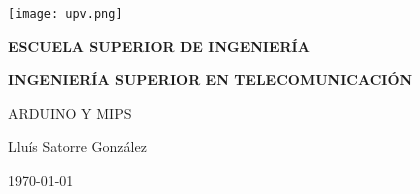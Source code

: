 

\begin{titlepage}

  \begin{center}

    \texttt{[image: upv.png]} \\
    
    \vspace{2.0cm}
    
    \LARGE{\textbf{ESCUELA SUPERIOR DE INGENIERÍA}} \\
    
    \vspace{1.0cm}
    
    \Large{\textbf{INGENIERÍA SUPERIOR EN TELECOMUNICACIÓN}} \\
    
    \vspace{3.0cm}
    
    \Large{ARDUINO Y MIPS} \\
    
    \vspace{2.0cm}
    
    \Large{Lluís Satorre González} \\
  
    \vspace{0.5cm}

    \large{\today}
    
  \end{center}
\end{titlepage}
